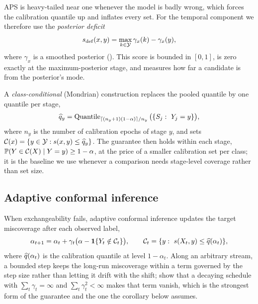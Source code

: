 APS is heavy-tailed near one whenever the model is badly wrong, which forces
the calibration quantile up and inflates every set. For the temporal
component we therefore use the \emph{posterior deficit}
\begin{equation}
s_{\mathrm{def}}(x,y)=\max_{k\in\mathcal{Y}}\gamma_x(k)-\gamma_x(y),
\label{eq:deficit}
\end{equation}
where $\gamma_x$ is a smoothed posterior (). This
score is bounded in $[0,1]$, is zero exactly at the maximum-posterior stage,
and measures how far a candidate is from the posterior's mode.

A \emph{class-conditional} (Mondrian) construction \citep{vovk2012} replaces
the pooled quantile by one quantile per stage,
\begin{equation}
\widehat{q}_y=\operatorname{Quantile}_{\lceil(n_y+1)(1-\alpha)\rceil/n_y}
\big(\{S_j:\ Y_j=y\}\big),
\label{eq:mondrian}
\end{equation}
where $n_y$ is the number of calibration epochs of stage $y$, and sets
$\mathcal{C}(x)=\{y\in\mathcal{Y}: s(x,y)\le\widehat{q}_y\}$. The guarantee then holds within each
stage, $\mathbb{P}(Y\in\mathcal{C}(X)\mid Y=y)\ge 1-\alpha$, at the price of a smaller
calibration set per class; it is the baseline we use whenever a comparison
needs stage-level coverage rather than set size.

\subsection{Adaptive conformal inference}
\label{sec:aci}

When exchangeability fails, adaptive conformal inference \citep{gibbs2021}
updates the target miscoverage after each observed label,
\begin{equation}
\alpha_{t+1}=\alpha_t+\gamma_t\big(\alpha-\mathbf{1}\{Y_t\notin\mathcal{C}_t\}\big),
\qquad
\mathcal{C}_t=\{y:\ s(X_t,y)\le \widehat{q}(\alpha_t)\},
\label{eq:aci}
\end{equation}
where $\widehat{q}(\alpha_t)$ is the calibration quantile at level $1-\alpha_t$.
Along an arbitrary stream, a bounded step keeps the long-run miscoverage
within a term governed by the step size rather than letting it drift with the
shift; \citet{angelopoulos2024} show that a decaying schedule with
$\sum_t\gamma_t=\infty$ and $\sum_t\gamma_t^2<\infty$ makes that term vanish,
which is the strongest form of the guarantee and the one the corollary below
assumes.
